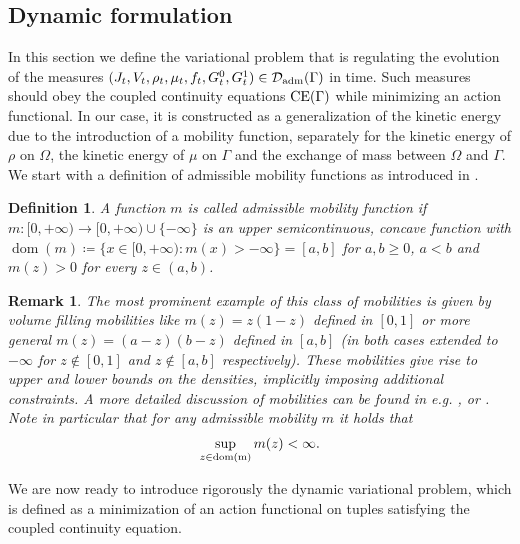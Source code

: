 \documentclass{article}
\DeclareMathOperator{\domain}{dom}
\newtheorem{definition}[theorem]{Definition}
\newtheorem{remark}[theorem]{Remark}
\begin{document}
\subsection{Dynamic formulation}\label{sec:dynamicformulation}
In this section we define the variational problem that is regulating the evolution of the measures $(J_t,V_t,\rho_t,\mu_t,f_t,G^0_t,G^1_t) \in  \mathcal{D}_{\rm adm}(\Gamma)$ in time. Such measures should obey the coupled continuity equations ${\rm CE}(\Gamma)$ while minimizing an action functional.
%
In our case, it is constructed as a generalization of the kinetic energy due to the introduction of a mobility function, separately for the kinetic energy of $\rho$ on $\Omega$, the kinetic energy of $\mu$ on $\Gamma$ and the exchange of mass between $\Omega$ and $\Gamma$. 
%
We start with a definition of admissible mobility functions as introduced in \cite{Lisini2010}.
 \begin{definition} A function $m$ is called \emph{admissible mobility function} if  $m: [0,+\infty) \rightarrow [0,+\infty) \cup\{-\infty\}$ is an upper semicontinuous, concave function with $\domain(m)\coloneqq \{x\in[0,+\infty) : m(x) >-\infty \} =[a, b]$ for $a,b \geq 0$, $a<b$ and $m(z)>0$ for every $z \in (a, b)$. 

\end{definition}
\begin{remark}\label{rem:bound}
    The most prominent example of this class of mobilities is given by volume filling mobilities like $m(z)=z(1-z)$ defined in $[0,1]$ or more general $m(z) = (a-z)(b-z)$ defined in $[a,b]$ (in both cases extended to $-\infty$ for $z \notin [0,1]$ and $z \notin [a,b]$ respectively). These mobilities give rise to upper and lower bounds on the densities, implicitly imposing additional constraints. A more detailed discussion of mobilities can be found in e.g. \cite{Lisini2010}, \cite{Dolbeault_2008} or \cite{Carrillo2010}.
    Note in particular that for any admissible mobility $m$ it holds that 
    \begin{align}\label{eq:finite_sup}
        \sup_{z\in \rm dom(m)} m(z) <\infty.
    \end{align}
\end{remark}


We are now ready to introduce rigorously the dynamic variational problem, which is defined as a minimization of an action functional on tuples satisfying the coupled continuity equation.
\end{document}
